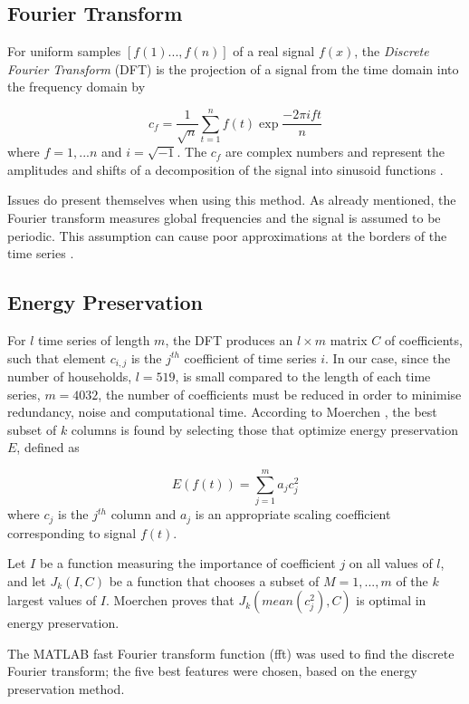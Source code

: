 


\subsection*{Fourier Transform}

For uniform samples $[f(1)...,f(n)]$ of a real signal $f(x)$, the \textit{Discrete Fourier Transform} (DFT) is the projection of a signal from the time domain into the frequency domain by

\[c_f=\frac{1}{\sqrt{n}}\sum_{t=1}^nf(t)\exp{\frac{-2\pi ift}{n}}\]
where $f=1,...n$ and $i=\sqrt{-1}$. The $c_f$ are complex numbers and represent
the amplitudes and shifts of a decomposition of the signal into sinusoid functions \cite{Moerchen}.


Issues do present themselves when using this method. As already mentioned, the Fourier transform measures global frequencies and the signal is assumed to be periodic. This assumption can cause poor approximations at the borders of the time series \cite{Moerchen}.

\subsection*{Energy Preservation}

For $l$ time series of length $m$, the DFT produces an $l \times m$ matrix $C $ of coefficients, such that element $c_{i,j}$ is the $j^{th}$ coefficient of time series $i$. In our case, since the number of households, $l=519$, is small compared to the length of each time series, $m=4032$, the number of coefficients must be reduced in order to minimise redundancy, noise and computational time. According to Moerchen \cite{Moerchen}, the best subset of $k$ columns is found by selecting those that optimize energy preservation $E$, defined as

\[E(f(t))=\sum_{j=1}^ma_jc^2_j\] 
where $c_j$ is the $j^{th}$ column and $a_j$ is an appropriate scaling coefficient corresponding to signal $f(t)$. 

Let $I$ be a function measuring the importance of coefficient $j$ on all values of $l$, and let $J_k(I,C)$ be a function that chooses a subset of $M = {1, ..., m}$ of the $k$ largest values of $I$. Moerchen \cite{Moerchen} proves that $J_k(mean(c_j^2),C)$ is optimal in energy preservation.

The MATLAB fast Fourier transform function (fft) was used to find the discrete Fourier transform; the five best features were chosen, based on the energy preservation method.


